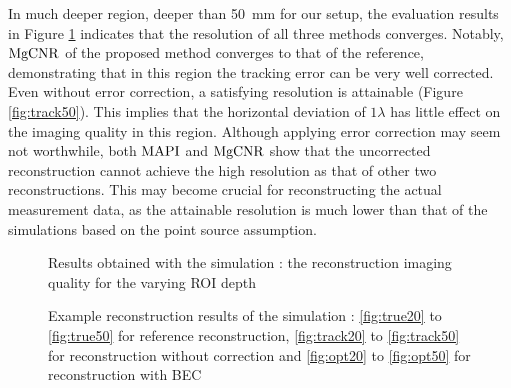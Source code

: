 In much deeper region, deeper than \SI{50}{\milli \metre} for our setup, the evaluation results in Figure \ref{fig:results_depth} indicates that the resolution of all three methods converges. Notably, $\operatorname{MgCNR}$ of the proposed method converges to that of the reference, demonstrating that in this region the tracking error can be very well corrected. Even without error correction, a satisfying resolution is attainable (Figure \ref{fig:track50}). This implies that the horizontal deviation of $1 \lambda$ has little effect on the imaging quality in this region. Although applying error correction may seem not worthwhile, both $\operatorname{MAPI}$ and $\operatorname{MgCNR}$ show that the uncorrected reconstruction cannot achieve the high resolution as that of other two reconstructions. This may become crucial for reconstructing the actual measurement data, as the attainable resolution is much lower than that of the simulations based on the point source assumption.

\begin{figure}

\setlength{\abovecaptionskip}{-5pt} %
\caption{Results obtained with the simulation : the reconstruction imaging quality for the varying ROI depth}
\label{fig:results_depth}
\end{figure}

\begin{figure}	

\caption{Example reconstruction results of the simulation : \ref{fig:true20} to \ref{fig:true50} for reference reconstruction, \ref{fig:track20} to \ref{fig:track50} for reconstruction without correction and \ref{fig:opt20} to \ref{fig:opt50} for reconstruction with BEC}
\label{fig:recoimg_depth}
\end{figure}
